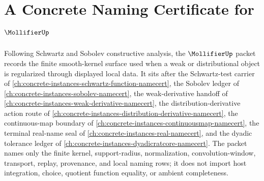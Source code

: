 \chapter{A Concrete Naming Certificate for $\MollifierUp$}
\label{ch:concrete-instances-mollifier-namecert}

Following Schwartz and Sobolev constructive analysis, the $\MollifierUp$ packet records the finite smooth-kernel surface used when a weak or distributional object is regularized through displayed local data. It sits after the Schwartz-test carrier of \autoref{ch:concrete-instances-schwartz-function-namecert}, the Sobolev ledger of \autoref{ch:concrete-instances-sobolev-namecert}, the weak-derivative handoff of \autoref{ch:concrete-instances-weak-derivative-namecert}, the distribution-derivative action route of \autoref{ch:concrete-instances-distribution-derivative-namecert}, the continuous-map boundary of \autoref{ch:concrete-instances-continuousmap-namecert}, the terminal real-name seal of \autoref{ch:concrete-instances-real-namecert}, and the dyadic tolerance ledger of \autoref{ch:concrete-instances-dyadicratcore-namecert}. The packet names only the finite kernel, support-radius, normalization, convolution-window, transport, replay, provenance, and local naming rows; it does not import host integration, choice, quotient function equality, or ambient completeness.

